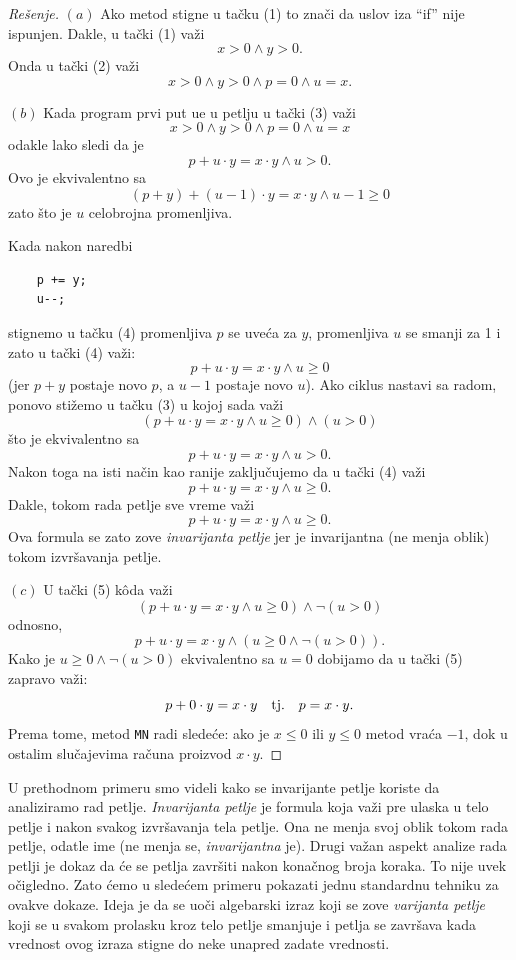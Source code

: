 \begin{proof}[Re\v senje]
  $(a)$
  Ako metod stigne u ta\v cku (1) to zna\v ci da uslov iza \enquote{if} nije ispunjen. Dakle, u ta\v cki (1)
  va\v zi
  $$
    x > 0 \land y > 0.
  $$
  Onda u ta\v cki (2) va\v zi
  $$
    x > 0 \land y > 0 \land p = 0 \land u = x.
  $$

  $(b)$
  Kada program prvi put u\dj e u petlju u ta\v cki (3) va\v zi
  $$
    x > 0 \land y > 0 \land p = 0 \land u = x
  $$
  odakle lako sledi da je
  $$
    p + u\cdot y = x \cdot y \land u > 0.
  $$
  Ovo je ekvivalentno sa
  $$
    (p + y) + (u - 1)\cdot y = x \cdot y \land u - 1 \ge 0
  $$
  zato \v sto je $u$ celobrojna promenljiva.

\clearpage

\noindent
  Kada nakon naredbi
  {\small
  \begin{verbatim}
    p += y;
    u--;
  \end{verbatim}}
  \noindent
  stignemo u ta\v cku (4) promenljiva $p$ se uve\'ca za $y$, promenljiva $u$ se smanji za 1 i zato u ta\v cki (4) va\v zi:
  $$
    p + u\cdot y = x \cdot y \land u \ge 0
  $$
  (jer $p + y$ postaje novo $p$, a $u - 1$ postaje novo $u$). Ako ciklus nastavi sa radom, ponovo sti\v zemo u ta\v cku (3)
  u kojoj sada va\v zi
  $$
    (p + u\cdot y = x \cdot y \land u \ge 0) \land (u > 0)
  $$
  \v sto je ekvivalentno sa
  $$
    p + u\cdot y = x \cdot y \land u > 0.
  $$
  Nakon toga na isti na\v cin kao ranije zaklju\v cujemo da u ta\v cki (4) va\v zi
  $$
    p + u\cdot y = x \cdot y \land u \ge 0.
  $$
  Dakle, tokom rada petlje sve vreme va\v zi
  $$
    p + u\cdot y = x \cdot y \land u \ge 0.
  $$
  Ova formula se zato zove \emph{invarijanta petlje} jer je invarijantna (ne menja oblik) tokom izvr\v savanja petlje.
  
  $(c)$
  U ta\v cki (5) k\^oda va\v zi
  $$
    (p + u\cdot y = x \cdot y \land u \ge 0) \land \lnot(u > 0)
  $$
  odnosno,
  $$
    p + u\cdot y = x \cdot y \land (u \ge 0 \land \lnot(u > 0)).
  $$
  Kako je $u \ge 0 \land \lnot (u > 0)$ ekvivalentno sa $u = 0$ dobijamo da u ta\v cki (5) zapravo va\v zi:
  $$
    p + 0\cdot y = x \cdot y \text{\quad tj.\quad} p = x\cdot y.
  $$
  Prema tome, metod \verb"MN" radi slede\'ce: ako je $x \le 0$ ili $y \le 0$ metod vra\'ca $-1$, dok u ostalim slu\v cajevima
  ra\v cuna proizvod $x \cdot y$.
\end{proof}

U prethodnom primeru smo videli kako se invarijante petlje koriste da analiziramo rad petlje. \emph{Invarijanta petlje} je formula
koja va\v zi pre ulaska u telo petlje i nakon svakog izvr\v savanja tela petlje.
Ona ne menja svoj oblik tokom rada petlje, odatle ime (ne menja se, \emph{invarijantna} je).
Drugi va\v zan aspekt analize rada petlji je dokaz da \'ce se petlja zavr\v siti nakon kona\v cnog broja koraka. To nije uvek
o\v cigledno. Zato \'cemo u slede\'cem primeru pokazati jednu standardnu tehniku za ovakve dokaze. Ideja je da se uo\v ci
algebarski izraz koji se zove \emph{varijanta petlje} koji se u svakom prolasku kroz telo petlje smanjuje i petlja se zavr\v sava
kada vrednost ovog izraza stigne do neke unapred zadate vrednosti.

